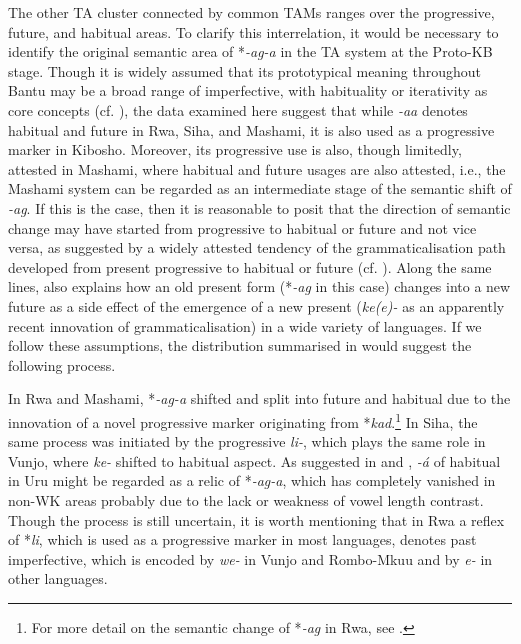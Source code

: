 \documentclass[output=paper]{langscibook}
\begin{document}
The other TA cluster connected by common TAMs ranges over the progressive, future, and habitual areas. To clarify this interrelation, it would be necessary to identify the original semantic area of *\textit{{}-ag-a} in the TA system at the Proto-KB stage. Though it is widely assumed that its prototypical meaning throughout Bantu may be a broad range of imperfective, with habituality or iterativity as core concepts (cf. \cites[110]{Meeussen1967}[262--263]{Nurse2008}), the data examined here suggest that while \textit{{}-aa} denotes habitual and future in Rwa, Siha, and Mashami, it is also used as a progressive marker in Kibosho. Moreover, its progressive use is also, though limitedly, attested in Mashami, where habitual and future usages are also attested, i.e., the Mashami system can be regarded as an intermediate stage of the semantic shift of \textit{{}-ag}. If this is the case, then it is reasonable to posit that the direction of semantic change may have started from progressive to habitual or future and not vice versa, as suggested by a widely attested tendency of the grammaticalisation path developed from present progressive to habitual or future (cf. \citealt[158]{BybeeEtAl1994}). Along the same lines, \citet{Haspelmath1998} also explains how an old present form (*\textit{{}-ag} in this case) changes into a new future as a side effect of the emergence of a new present (\textit{ke(e)-} as an apparently recent innovation of grammaticalisation) in a wide variety of languages. If we follow these assumptions, the distribution summarised in  would suggest the following process.

In Rwa and Mashami, *\textit{{}-ag-a} shifted and split into future and habitual due to the innovation of a novel progressive marker originating from *\textit{kad}.\footnote{For more detail on the semantic change of *\textit{{}-ag} in Rwa, see \citet{Shinagawa2009}.} In Siha, the same process was initiated by the progressive \textit{li-}, which plays the same role in Vunjo, where \textit{ke-} shifted to habitual aspect. As suggested in   and , \textit{{}-á} of habitual in Uru might be regarded as a relic of *\textit{{}-ag-a}, which has completely vanished in non-WK areas probably due to the lack or weakness of vowel length contrast. Though the process is still uncertain, it is worth mentioning that in Rwa a reflex of *\textit{li}, which is used as a progressive marker in most languages, denotes past imperfective, which is encoded by \textit{we-} in Vunjo and Rombo-Mkuu and by \textit{e-} in other languages.
\end{document}
